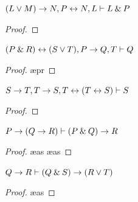 {{{{{{{{{\begin{small}
\begin{earg}
\item $(L \vee M) \rightarrow N, P \leftrightarrow N, L \vdash L \mathbin{\&} P$\smallskip
\begin{proof}
 \pr{}
 \pr{}
 \pr{}
 
 
 
 
\end{proof}
\medskip


\noindent\begin{minipage}{0.99\textwidth}
\item $(P \mathbin{\&} R) \leftrightarrow (S \vee T), P \rightarrow Q, T \vdash Q$
\begin{proof}
 \pr{}
 \pr{}
 \pr{}
 
 
 \ae{pr}
 
\end{proof}
\end{minipage}
\medskip


\noindent\begin{minipage}{0.99\textwidth}
\item $S \rightarrow T, T \rightarrow S, T \leftrightarrow (T \leftrightarrow S) \vdash S$
\begin{proof}
 \pr{}
 \pr{}
 \pr{}
 
 
 
\end{proof}
\end{minipage}
\bigskip

\end{earg}




\problempart
\begin{earg}
\item $P \rightarrow (Q \rightarrow R) \vdash (P \mathbin{\&} Q) \rightarrow R$
\begin{proof}
	 \pr{}
	\open
	 \as{}
	 \ae{as}
	 
	 \ae{as}
	 
	\close
	 
\end{proof}
\medskip


\noindent\begin{minipage}{0.99\textwidth}
\item $Q \rightarrow R \vdash (Q \mathbin{\&} S) \rightarrow (R \vee T)$ 
\begin{proof}
	 \pr{}
	\open
	 \as{}
	 \ae{as}
	 
	 
	\close
	 
\end{proof}
\medskip
\end{minipage}


\end{earg}
\end{small}}}}}}}}}}
